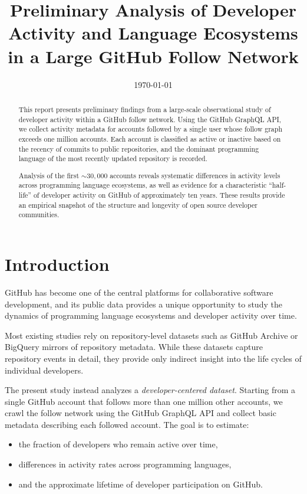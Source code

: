 \documentclass[12pt,a4paper]{article}
\title{Preliminary Analysis of Developer Activity and Language Ecosystems\\
in a Large GitHub Follow Network}
\author{}
\date{\today}
\begin{document}
\maketitle

\begin{abstract}
This report presents preliminary findings from a large-scale observational study
of developer activity within a GitHub follow network. Using the GitHub GraphQL
API, we collect activity metadata for accounts followed by a single user whose
follow graph exceeds one million accounts. Each account is classified as active
or inactive based on the recency of commits to public repositories, and the
dominant programming language of the most recently updated repository is
recorded.

Analysis of the first $\sim30{,}000$ accounts reveals systematic differences in
activity levels across programming language ecosystems, as well as evidence for
a characteristic ``half-life'' of developer activity on GitHub of approximately
ten years. These results provide an empirical snapshot of the structure and
longevity of open source developer communities.
\end{abstract}

\section{Introduction}

GitHub has become one of the central platforms for collaborative software
development, and its public data provides a unique opportunity to study the
dynamics of programming language ecosystems and developer activity over time.

Most existing studies rely on repository-level datasets such as GitHub Archive
or BigQuery mirrors of repository metadata. While these datasets capture
repository events in detail, they provide only indirect insight into the life
cycles of individual developers.

The present study instead analyzes a \emph{developer-centered dataset}. Starting
from a single GitHub account that follows more than one million other accounts,
we crawl the follow network using the GitHub GraphQL API and collect basic
metadata describing each followed account. The goal is to estimate:
\begin{itemize}
\item the fraction of developers who remain active over time,
\item differences in activity rates across programming languages,
\item and the approximate lifetime of developer participation on GitHub.
\end{itemize}
\end{document}

